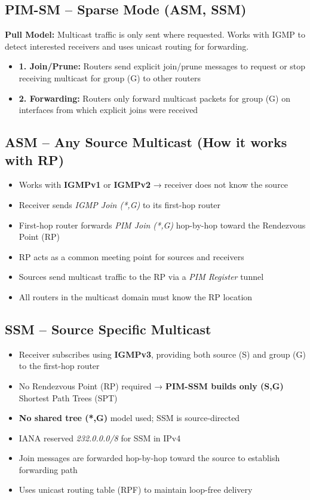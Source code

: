 \begin{multicols*}{5}
		\subsection{PIM-SM – Sparse Mode (ASM, SSM)}
		\textbf{Pull Model:} Multicast traffic is only sent where requested. Works with IGMP to detect interested receivers and uses unicast routing for forwarding.
		
		\begin{itemize}
			\item \textbf{1. Join/Prune:} Routers send explicit join/prune messages to request or stop receiving multicast for group (G) to other routers
			\item \textbf{2. Forwarding:} Routers only forward multicast packets for group (G) on interfaces from which explicit joins were received
		\end{itemize}
		
		\subsection{ASM – Any Source Multicast (How it works with RP)}
		\begin{itemize}
			\item Works with \textbf{IGMPv1} or \textbf{IGMPv2} → receiver does not know the source
			\item Receiver sends \textit{IGMP Join (*,G)} to its first-hop router
			\item First-hop router forwards \textit{PIM Join (*,G)} hop-by-hop toward the Rendezvous Point (RP)
			\item RP acts as a common meeting point for sources and receivers
			\item Sources send multicast traffic to the RP via a \textit{PIM Register} tunnel
			\item All routers in the multicast domain must know the RP location
		\end{itemize}
		
		\subsection{SSM – Source Specific Multicast}
		\begin{itemize}
			\item Receiver subscribes using \textbf{IGMPv3}, providing both source (S) and group (G) to the first-hop router
			\item No Rendezvous Point (RP) required → \textbf{PIM-SSM builds only (S,G)} Shortest Path Trees (SPT)
			\item \textbf{No shared tree (*,G)} model used; SSM is source-directed
			\item IANA reserved \textit{232.0.0.0/8} for SSM in IPv4
			\item Join messages are forwarded hop-by-hop toward the source to establish forwarding path
			\item Uses unicast routing table (RPF) to maintain loop-free delivery
		\end{itemize}
		

\end{multicols*}
